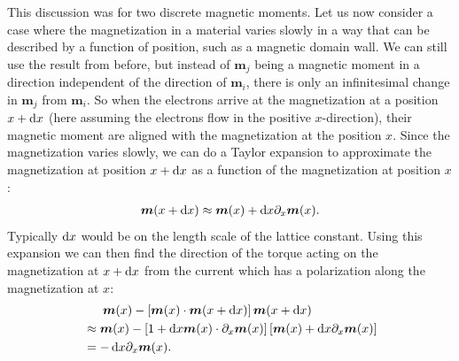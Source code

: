 This discussion was for two discrete magnetic moments. Let us now consider a case where the magnetization in a material varies slowly in a way that can be described by a function of position, such as a magnetic domain wall. We can still use the result from before, but instead of $\mathbold{m}_j$ being a magnetic moment in a direction independent of the direction of $\mathbold{m}_i$, there is only an infinitesimal change in $\mathbold{m}_j$ from $\mathbold{m}_i$. So when the electrons arrive at the magnetization at a position $x+\operatorname{d}\!{x}$ (here assuming the electrons flow in the positive $x$-direction), their magnetic moment are aligned with the magnetization at the position $x$. Since the magnetization varies slowly, we can do a Taylor expansion to approximate the magnetization at position $x+\operatorname{d}\!{x}$ as a function of the magnetization at position $x$:
\begin{align}
    \mathbold{m}(x+\d x) \approx \mathbold{m}(x) + \d x\partial_x \mathbold{m}(x).
\end{align}
Typically $\operatorname{d}\!{x}$ would be on the length scale of the lattice constant. Using this expansion we can then find the direction of the torque acting on the magnetization at $x+\operatorname{d}\!{x}$ from the current which has a polarization along the magnetization at $x$:
\begin{align}
\nonumber&\hspace{5.5mm}\mathbold{m}(x)-\left[\mathbold{m}(x)\cdot\mathbold{m}(x+\d x)\right]\mathbold{m}(x+\d x) \\
\nonumber&\approx \mathbold{m}(x)-\left[1 + \d x \mathbold{m}(x)\cdot\partial_x \mathbold{m}(x)\right]\left[\mathbold{m}(x) + \d x\partial_x \mathbold{m}(x)\right] \\
&= -\d x \partial_x \mathbold{m}(x). \label{eq:DiffSTTterm}
\end{align}
